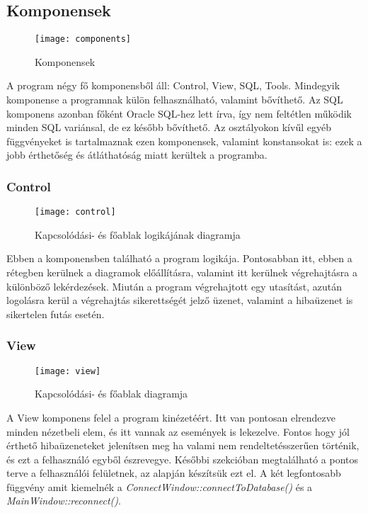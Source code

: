 \subsection{Komponensek}

\begin{figure}[ht]
  \begin{center}
  \texttt{[image: components]}
  \end{center}
 \caption{Komponensek}
\end{figure}

A program négy fő komponensből áll: Control, View, SQL, Tools. Mindegyik komponense a programnak külön felhasználható,
valamint bővíthető. Az SQL komponens azonban főként Oracle SQL-hez lett írva, így nem feltétlen működik minden
SQL variánsal, de ez később bővíthető. Az osztályokon kívűl egyéb függvényeket is tartalmaznak ezen komponensek, valamint
konstansokat is: ezek a jobb érthetőség és átláthatóság miatt kerültek a programba.

\subsubsection{Control}

\begin{figure}[ht]
  \begin{center}
  \texttt{[image: control]}
  \end{center}
 \caption{ Kapcsolódási- és főablak logikájának diagramja}
\end{figure}

Ebben a komponensben található a program logikája. Pontosabban itt, ebben a rétegben kerülnek a diagramok előállításra, valamint
itt kerülnek végrehajtásra a különböző lekérdezések. Miután a program végrehajtott egy utasítást, azután logolásra kerül a végrehajtás sikerettségét
jelző üzenet, valamint a hibaüzenet is sikertelen futás esetén.

\subsubsection{View}

\begin{figure}[ht]
  \begin{center}
  \texttt{[image: view]}
  \end{center}
 \caption{Kapcsolódási- és főablak diagramja}
\end{figure}

A View komponens felel a program kinézetéért. Itt van pontosan elrendezve minden nézetbeli elem, és itt vannak az események is lekezelve.
Fontos hogy jól érthető hibaüzeneteket jelenítsen meg ha valami nem rendeltetésszerűen történik, és ezt a felhasználó egyből észrevegye.
Későbbi szekcióban megtalálható a pontos terve a felhasználói felületnek, az alapján készítsük ezt el. A két legfontosabb függvény amit kiemelnék
a \textit{ConnectWindow::connectToDatabase()} és a \textit{MainWindow::reconnect()}.

